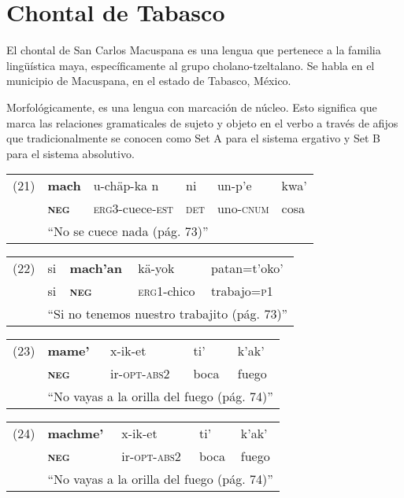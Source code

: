 \section*{Chontal de Tabasco}

\noindent El chontal de San Carlos Macuspana es una lengua que pertenece a la familia lingüística maya, específicamente al grupo cholano-tzeltalano. Se habla en el municipio de Macuspana, en el estado de Tabasco, México.

Morfológicamente, es una lengua con marcación de núcleo. Esto significa que marca las relaciones gramaticales de sujeto y objeto en el verbo a través de afijos que tradicionalmente se conocen como Set A para el sistema ergativo y Set B para el sistema absolutivo.\vspace{0.5cm}

{\setmainfont{Charis SIL} 

\begin{tabular}{llllll}
(21) & \textbf{mach} & u-chäp-ka n& ni & un-p'e & kwa' \\
& \textsc{\textbf{neg}} & \textsc{erg3}-cuece-\textsc{est} & \textsc{det} & uno-\textsc{cnum} & cosa \\
& \multicolumn{5}{l}{``No se cuece nada (pág. 73)''} \\
\end{tabular} \vspace{0.3cm}

\begin{tabular}{lllll}
(22) & si & \textbf{mach'an} & kä-yok  & patan=t'oko'\\
& si & \textsc{\textbf{neg}} & \textsc{erg1}-chico & trabajo=\textsc{p1}\\
& \multicolumn{4}{l}{``Si no tenemos nuestro trabajito (pág. 73)''} \\
\end{tabular} \vspace{0.3cm}

\begin{tabular}{lllll}
(23) & \textbf{mame'} & x-ik-et & ti' & k'ak' \\
& \textsc{\textbf{neg}} & ir-\textsc{opt-abs2} & boca & fuego\\
& \multicolumn{4}{l}{``No vayas a la orilla del fuego (pág. 74)''} \\
\end{tabular} \vspace{0.3cm}

\begin{tabular}{lllll}
(24) & \textbf{machme'} & x-ik-et & ti' & k'ak' \\
& \textsc{\textbf{neg}} & ir-\textsc{opt-abs2} & boca & fuego\\
& \multicolumn{4}{l}{``No vayas a la orilla del fuego (pág. 74)''} \\
\end{tabular} \vspace{0.3cm}

}
